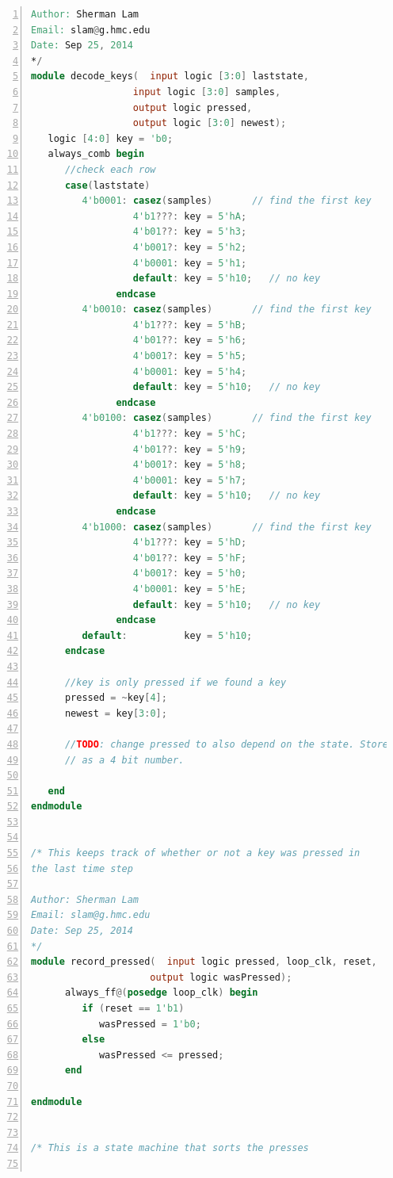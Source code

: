 \documentclass[11pt]{article}
\begin{document}
\begin{lstlisting}[language=Verilog,numbers=left,basicstyle=\footnotesize]
Author: Sherman Lam
Email: slam@g.hmc.edu
Date: Sep 25, 2014
*/
module decode_keys(  input logic [3:0] laststate,
                  input logic [3:0] samples,
                  output logic pressed,
                  output logic [3:0] newest);
   logic [4:0] key = 'b0;
   always_comb begin
      //check each row
      case(laststate)
         4'b0001: casez(samples)       // find the first key
                  4'b1???: key = 5'hA;
                  4'b01??: key = 5'h3;
                  4'b001?: key = 5'h2;
                  4'b0001: key = 5'h1;
                  default: key = 5'h10;   // no key      
               endcase  
         4'b0010: casez(samples)       // find the first key
                  4'b1???: key = 5'hB;
                  4'b01??: key = 5'h6;
                  4'b001?: key = 5'h5;
                  4'b0001: key = 5'h4;
                  default: key = 5'h10;   // no key      
               endcase  
         4'b0100: casez(samples)       // find the first key
                  4'b1???: key = 5'hC;
                  4'b01??: key = 5'h9;
                  4'b001?: key = 5'h8;
                  4'b0001: key = 5'h7;
                  default: key = 5'h10;   // no key      
               endcase        
         4'b1000: casez(samples)       // find the first key
                  4'b1???: key = 5'hD;
                  4'b01??: key = 5'hF;
                  4'b001?: key = 5'h0;
                  4'b0001: key = 5'hE;
                  default: key = 5'h10;   // no key      
               endcase  
         default:          key = 5'h10;
      endcase
      
      //key is only pressed if we found a key
      pressed = ~key[4];
      newest = key[3:0];
      
      //TODO: change pressed to also depend on the state. Store pressed
      // as a 4 bit number.
   
   end
endmodule
      
               
/* This keeps track of whether or not a key was pressed in
the last time step

Author: Sherman Lam
Email: slam@g.hmc.edu
Date: Sep 25, 2014
*/
module record_pressed(  input logic pressed, loop_clk, reset,
                     output logic wasPressed);
      always_ff@(posedge loop_clk) begin
         if (reset == 1'b1)
            wasPressed = 1'b0;
         else
            wasPressed <= pressed;
      end
   
endmodule   


/* This is a state machine that sorts the presses


\end{lstlisting}
\end{document}
